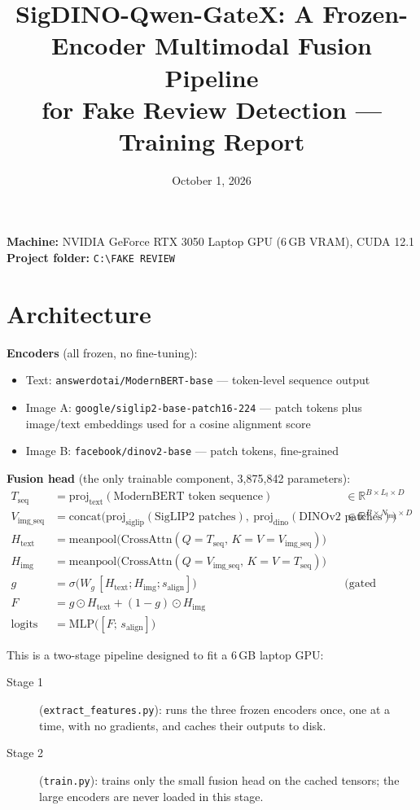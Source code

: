 \documentclass[11pt]{article}
\title{SigDINO-Qwen-GateX: A Frozen-Encoder Multimodal Fusion Pipeline\\
for Fake Review Detection --- Training Report}
\author{}
\date{October 1, 2026}
\begin{document}
\maketitle

\noindent
\textbf{Machine:} NVIDIA GeForce RTX 3050 Laptop GPU (6\,GB VRAM), CUDA 12.1\\
\textbf{Project folder:} \texttt{C:\textbackslash FAKE REVIEW}

\section{Architecture}

\textbf{Encoders} (all frozen, no fine-tuning):
\begin{itemize}[nosep]
    \item Text: \texttt{answerdotai/ModernBERT-base} --- token-level sequence output
    \item Image A: \texttt{google/siglip2-base-patch16-224} --- patch tokens plus image/text embeddings used for a cosine alignment score
    \item Image B: \texttt{facebook/dinov2-base} --- patch tokens, fine-grained
\end{itemize}

\textbf{Fusion head} (the only trainable component, 3{,}875{,}842 parameters):
\begin{align}
T_{\text{seq}} &= \mathrm{proj}_{\text{text}}(\text{ModernBERT token sequence}) &&\in \mathbb{R}^{B \times L_t \times D}\\
V_{\text{img\_seq}} &= \mathrm{concat}\big(\mathrm{proj}_{\text{siglip}}(\text{SigLIP2 patches}),\ \mathrm{proj}_{\text{dino}}(\text{DINOv2 patches})\big) &&\in \mathbb{R}^{B \times N_{\text{img}} \times D}\\
H_{\text{text}} &= \mathrm{meanpool}\big(\mathrm{CrossAttn}(Q{=}T_{\text{seq}},\, K{=}V{=}V_{\text{img\_seq}})\big)\\
H_{\text{img}} &= \mathrm{meanpool}\big(\mathrm{CrossAttn}(Q{=}V_{\text{img\_seq}},\, K{=}V{=}T_{\text{seq}})\big)\\
g &= \sigma\big(W_g\,[H_{\text{text}}; H_{\text{img}}; s_{\text{align}}]\big) &&\text{(gated multimodal unit)}\\
F &= g \odot H_{\text{text}} + (1-g) \odot H_{\text{img}}\\
\text{logits} &= \mathrm{MLP}\big([F;\, s_{\text{align}}]\big)
\end{align}

This is a two-stage pipeline designed to fit a 6\,GB laptop GPU:
\begin{description}
    \item[Stage 1] (\texttt{extract\_features.py}): runs the three frozen encoders once, one at a time, with no gradients, and caches their outputs to disk.
    \item[Stage 2] (\texttt{train.py}): trains only the small fusion head on the cached tensors; the large encoders are never loaded in this stage.
\end{description}
\end{document}
